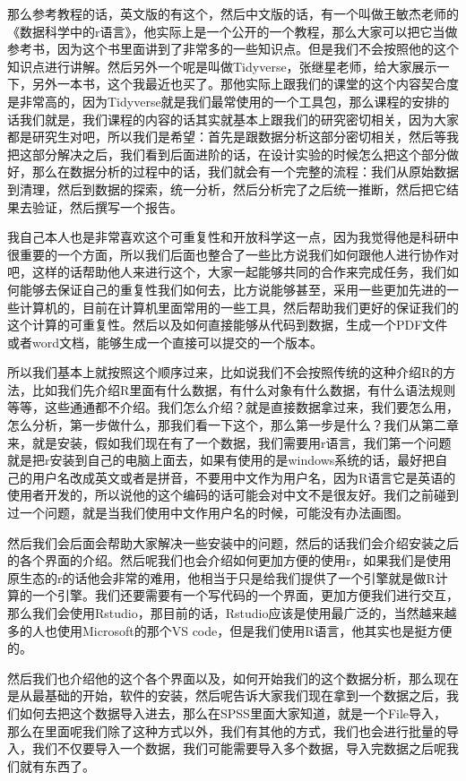 \documentclass[
  oneside]{book}
\begin{document}
那么参考教程的话，英文版的有这个，然后中文版的话，有一个叫做王敏杰老师的《数据科学中的r语言》，他实际上是一个公开的一个教程，那么大家可以把它当做参考书，因为这个书里面讲到了非常多的一些知识点。但是我们不会按照他的这个知识点进行讲解。然后另外一个呢是叫做Tidyverse，张继星老师，给大家展示一下，另外一本书，这个我最近也买了。那他实际上跟我们的课堂的这个内容契合度是非常高的，因为Tidyverse就是我们最常使用的一个工具包，那么课程的安排的话我们就是，我们课程的内容的话其实就基本上跟我们的研究密切相关，因为大家都是研究生对吧，所以我们是希望：首先是跟数据分析这部分密切相关，然后等我把这部分解决之后，我们看到后面进阶的话，在设计实验的时候怎么把这个部分做好，那么在数据分析的过程中的话，我们就会有一个完整的流程：我们从原始数据到清理，然后到数据的探索，统一分析，然后分析完了之后统一推断，然后把它结果去验证，然后撰写一个报告。

我自己本人也是非常喜欢这个可重复性和开放科学这一点，因为我觉得他是科研中很重要的一个方面，所以我们后面也整合了一些比方说我们如何跟他人进行协作对吧，这样的话帮助他人来进行这个，大家一起能够共同的合作来完成任务，我们如何能够去保证自己的重复性我们如何去，比方说能够甚至，采用一些更加先进的一些计算机的，目前在计算机里面常用的一些工具，然后帮助我们更好的保证我们的这个计算的可重复性。然后以及如何直接能够从代码到数据，生成一个PDF文件或者word文档，能够生成一个直接可以提交的一个版本。

所以我们基本上就按照这个顺序过来，比如说我们不会按照传统的这种介绍R的方法，比如我们先介绍R里面有什么数据，有什么对象有什么数据，有什么语法规则等等，这些通通都不介绍。我们怎么介绍？就是直接数据拿过来，我们要怎么用，怎么分析，第一步做什么，那我们看一下这个，那么第一步是什么？我们从第二章来，就是安装，假如我们现在有了一个数据，我们需要用r语言，我们第一个问题就是把r安装到自己的电脑上面去，如果有使用的是windows系统的话，最好把自己的用户名改成英文或者是拼音，不要用中文作为用户名，因为R语言它是英语的使用者开发的，所以说他的这个编码的话可能会对中文不是很友好。我们之前碰到过一个问题，就是当我们使用中文作用户名的时候，可能没有办法画图。

然后我们会后面会帮助大家解决一些安装中的问题，然后的话我们会介绍安装之后的各个界面的介绍。然后呢我们也会介绍如何更加方便的使用r，如果我们是使用原生态的r的话他会非常的难用，他相当于只是给我们提供了一个引擎就是做R计算的一个引擎。我们还要需要有一个写代码的一个界面，更加方便我们进行交互，那么我们会使用Rstudio，那目前的话，Rstudio应该是使用最广泛的，当然越来越多的人也使用Microsoft的那个VS code，但是我们使用R语言，他其实也是挺方便的。

然后我们也介绍他的这个各个界面以及，如何开始我们的这个数据分析，那么现在是从最基础的开始，软件的安装，然后呢告诉大家我们现在拿到一个数据之后，我们如何去把这个数据导入进去，那么在SPSS里面大家知道，就是一个File导入，那么在里面呢我们除了这种方式以外，我们有其他的方式，我们也会进行批量的导入，我们不仅要导入一个数据，我们可能需要导入多个数据，导入完数据之后呢我们就有东西了。
\end{document}
